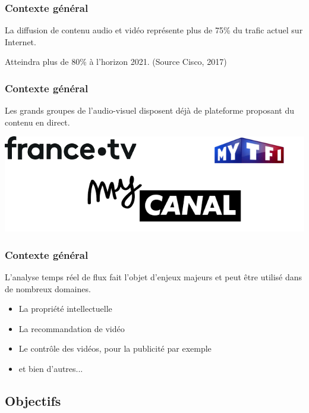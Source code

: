 \documentclass{beamer}
\begin{document}
\begin{frame}	

\frametitle{Contexte général}

La diffusion de contenu audio et vidéo représente plus de 75\% du trafic actuel sur Internet.

Atteindra plus de 80\% à l'horizon 2021. (Source Cisco, 2017)

\end{frame}

\begin{frame}	

\frametitle{Contexte général}

Les grands groupes de l'audio-visuel disposent déjà de plateforme proposant du contenu en direct.

\begin{center}
\includegraphics[scale=0.65]{Rapport_PR&D/images/exemple_sites}
\end{center}

\end{frame}


\begin{frame}	

\frametitle{Contexte général}

L'analyse temps réel de flux fait l'objet d'enjeux majeurs et peut être utilisé dans de nombreux domaines.

\begin{itemize}
	\item La propriété intellectuelle
	\item La recommandation de vidéo
	\item Le contrôle des vidéos, pour la publicité par exemple
	\item et bien d'autres...
\end{itemize}

\end{frame}


\subsection{Objectifs}
\end{document}
